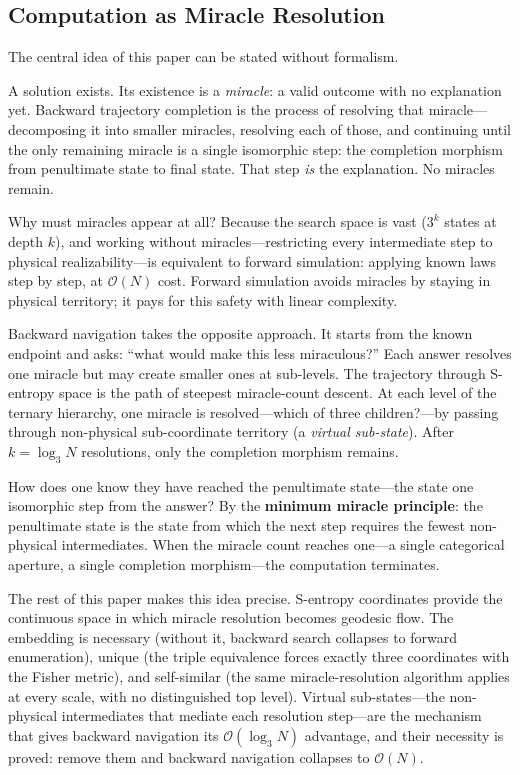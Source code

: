\documentclass[12pt,twocolumn]{article}
\begin{document}
\subsection{Computation as Miracle Resolution}

The central idea of this paper can be stated without formalism.

A solution exists. Its existence is a \emph{miracle}: a valid outcome with no explanation yet. Backward trajectory completion is the process of resolving that miracle---decomposing it into smaller miracles, resolving each of those, and continuing until the only remaining miracle is a single isomorphic step: the completion morphism from penultimate state to final state. That step \emph{is} the explanation. No miracles remain.

Why must miracles appear at all? Because the search space is vast ($3^k$ states at depth $k$), and working without miracles---restricting every intermediate step to physical realizability---is equivalent to forward simulation: applying known laws step by step, at $\mathcal{O}(N)$ cost. Forward simulation avoids miracles by staying in physical territory; it pays for this safety with linear complexity.

Backward navigation takes the opposite approach. It starts from the known endpoint and asks: ``what would make this less miraculous?'' Each answer resolves one miracle but may create smaller ones at sub-levels. The trajectory through S-entropy space is the path of steepest miracle-count descent. At each level of the ternary hierarchy, one miracle is resolved---which of three children?---by passing through non-physical sub-coordinate territory (a \emph{virtual sub-state}). After $k = \log_3 N$ resolutions, only the completion morphism remains.

How does one know they have reached the penultimate state---the state one isomorphic step from the answer? By the \textbf{minimum miracle principle}: the penultimate state is the state from which the next step requires the fewest non-physical intermediates. When the miracle count reaches one---a single categorical aperture, a single completion morphism---the computation terminates.

The rest of this paper makes this idea precise. S-entropy coordinates provide the continuous space in which miracle resolution becomes geodesic flow. The embedding is necessary (without it, backward search collapses to forward enumeration), unique (the triple equivalence forces exactly three coordinates with the Fisher metric), and self-similar (the same miracle-resolution algorithm applies at every scale, with no distinguished top level). Virtual sub-states---the non-physical intermediates that mediate each resolution step---are the mechanism that gives backward navigation its $\mathcal{O}(\log_3 N)$ advantage, and their necessity is proved: remove them and backward navigation collapses to $\mathcal{O}(N)$.
\end{document}
